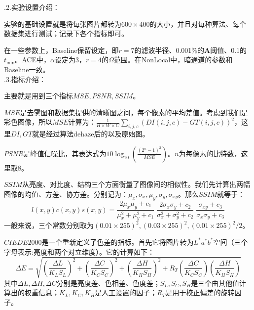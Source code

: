 \documentclass[12pt]{article}
\begin{document}
.2.实验设置介绍：\par
实验的基础设置就是将每张图片都转为$600\times 400$的大小，并且对每种算法、每个数据集进行测试；记录下各个指标即可。\par
在一些参数上，Baseline保留设定，即$r=7$的滤波半径、0.001\%的$\bm{A}$阈值、0.1的 $t_{\min} $。ACE中，$\alpha$设定为3，$r=4$的$\Omega$范围。在NonLocal中，暗通道的参数和Baseline一致。\\

.3.指标介绍：\par
主要就是用到三个指标$MSE,PSNR,SSIM$。\par
$MSE$是去雾图和数据集提供的清晰图之间，每个像素的平均差值。考虑到我们是彩色图像，所以$MSE$计算为：$\displaystyle \frac{1}{H\times W \times C}\sum_{i,j,c}(DI(i,j,c) - GT(i,j,c))^2$，这里$DI,GT$就是经过算法dehaze后的以及原始图。\par
$PSNR$是峰值信噪比，其表达式为$\displaystyle 10\log_{10}(\frac{(2^n-1)^2}{MSE})$。$n$为每像素的比特数，这里取8。\par
$SSIM$从亮度、对比度、结构三个方面衡量了图像间的相似性。我们先计算出两幅图像的均值、方差、协方差。分别记为：$\mu_x,\sigma_x,\mu_y,\sigma_y,\sigma_{xy}$。那么$SSIM$就等于：$$l(x,y)c(x,y)s(x,y)=\frac{2\mu_x\mu_y + c_1}{\mu_x^2+\mu_y^2+c_1}\;\frac{2\sigma_x\sigma_y + c_2}{\sigma^2_x + \sigma^2_y + c_2}\;\frac{\sigma_{xy}+c_3}{\sigma_x\sigma_y+c_3}$$
一般来说，三个常数分别取为$(0.01 \times 255)^2,(0.03 \times 255)^2,(0.01 \times 255)^2/2$。\par
$CIEDE2000$是一个重新定义了色差的指标。首先它将图片转为$L^*a^*b^*$空间（三个字母表示:亮度和两个对立维度）。它的计算如下：$$\displaystyle\Delta E = \sqrt{
(\frac{\Delta L}{K_L S_L})^2 + (\frac{\Delta C}{K_C S_C})^2 + (\frac{\Delta H}{K_H S_H})^2 + R_T(\frac{\Delta C}{K_C S_C})(\frac{\Delta H}{K_H S_H})
}$$
其中$\Delta L,\Delta H,\Delta C$分别是亮度差、色相差、色度差；$S_L,S_C,S_H$是三个由其他值计算出的权重信息；$K_L,K_C,K_H$是人工设置的因子；$R_T$是用于校正偏差的旋转因子。
\\
\end{document}
